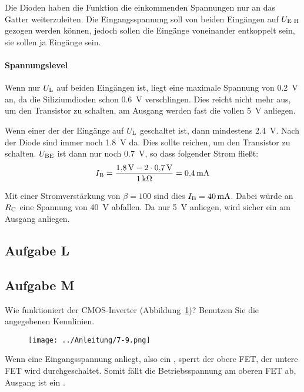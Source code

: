 Die Dioden
haben die Funktion die einkommenden Spannungen nur an das Gatter
weiterzuleiten. Die Eingangsspannung soll von beiden Eingängen auf $\UEH$
gezogen werden können, jedoch sollen die Eingänge voneinander entkoppelt sein,
sie sollen ja Eingänge sein.

\paragraph{Spannungslevel}

Wenn nur $\UL$ auf beiden Eingängen ist, liegt eine maximale Spannung von
\SI{.2}{\volt} an, da die Siliziumdioden schon \SI{.6}{\volt} verschlingen.
Dies reicht nicht mehr aus, um den Transistor zu schalten, am Ausgang werden
fast die vollen \SI{5}{\volt} anliegen.

Wenn einer der der Eingänge auf $\UL$ geschaltet ist, dann mindestens
\SI{2.4}{\volt}. Nach der Diode sind immer noch \SI{1.8}{\volt} da. Dies sollte
reichen, um den Transistor zu schalten. $\UBE$ ist dann nur noch
\SI{.7}{\volt}, so dass folgender Strom fließt:
\[
	\IB = \frac{\SI{1.8}\volt - 2 \cdot \SI{.7}\volt}{\SI1{\kilo\ohm}}
	= \SI{.4}{\milli\ampere}
\]

Mit einer Stromverstärkung von $\beta = 100$ sind dies $\IB =
\SI{40}{\milli\ampere}$. Dabei würde an $\RC$ eine Spannung von \SI{40}{\volt}
abfallen. Da nur \SI{5}{\volt} anliegen, wird sicher ein \thigh{} am Ausgang
anliegen.

\subsection{Aufgabe L}

\fehlt

\subsection{Aufgabe M}

\begin{problem}
	Wie funktioniert der CMOS-Inverter (Abbildung~\ref{fig:7-9})? Benutzen Sie
	die angegebenen Kennlinien.
\end{problem}

\begin{figure}[htbp]
	\centering
	\texttt{[image: ../Anleitung/7-9.png]}
	\caption{%
		\cite[Abbildung~7.9]{physik313-Anleitung}
	}
	\label{fig:7-9}
\end{figure}

Wenn eine Eingangsspannung anliegt, also ein \thigh, sperrt der obere FET, der
untere FET wird durchgeschaltet. Somit fällt die Betriebsspannung am oberen FET
ab, Ausgang ist ein \tlow.

